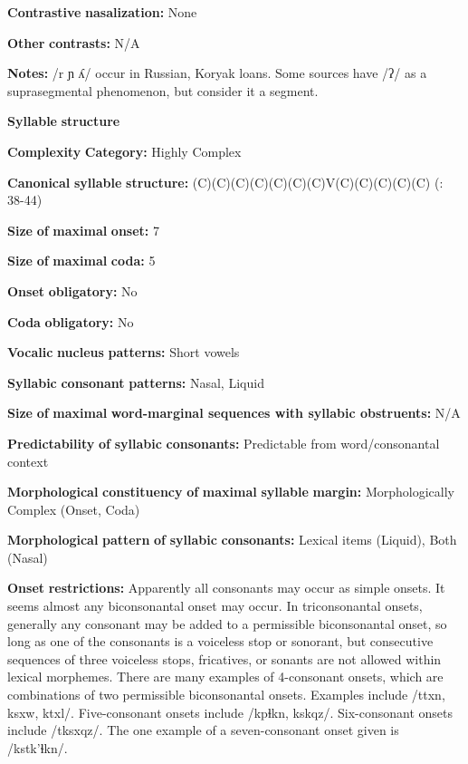\begin{styleBody}
\textbf{Contrastive} \textbf{nasalization:} None

\textbf{Other} \textbf{contrasts:} N/A

\textbf{Notes:} /r ɲ ʎ/ occur in Russian, Koryak loans. Some sources have /ʔ/ as a suprasegmental phenomenon, but \citet{GeorgVolodin1999} consider it a segment. 

\textbf{Syllable} \textbf{structure}

\textbf{Complexity} \textbf{Category:} Highly Complex

\textbf{Canonical} \textbf{syllable} \textbf{structure:} (C)(C)(C)(C)(C)(C)(C)V(C)(C)(C)(C)(C) (\citealt{GeorgVolodin1999}: 38-44)

\textbf{Size} \textbf{of} \textbf{maximal} \textbf{onset:} 7

\textbf{Size} \textbf{of} \textbf{maximal} \textbf{coda:} 5

\textbf{Onset} \textbf{obligatory:} No

\textbf{Coda} \textbf{obligatory:} No

\textbf{Vocalic} \textbf{nucleus} \textbf{patterns:} Short vowels

\textbf{Syllabic} \textbf{consonant} \textbf{patterns:} Nasal, Liquid

\textbf{Size} \textbf{of} \textbf{maximal} \textbf{word{}-marginal sequences with syllabic obstruents:} N/A

\textbf{Predictability} \textbf{of} \textbf{syllabic} \textbf{consonants:} Predictable from word/consonantal context

\textbf{Morphological} \textbf{constituency} \textbf{of} \textbf{maximal} \textbf{syllable} \textbf{margin:} Morphologically Complex (Onset, Coda)

\textbf{Morphological} \textbf{pattern} \textbf{of} \textbf{syllabic} \textbf{consonants:} Lexical items (Liquid), Both (Nasal)

\textbf{Onset} \textbf{restrictions:} Apparently all consonants may occur as simple onsets. It seems almost any biconsonantal onset may occur. In triconsonantal onsets, generally any consonant may be added to a permissible biconsonantal onset, so long as one of the consonants is a voiceless stop or sonorant, but consecutive sequences of three voiceless stops, fricatives, or sonants are not allowed within lexical morphemes. There are many examples of 4-consonant onsets, which are combinations of two permissible biconsonantal onsets. Examples include /ttxn, ksxw, ktxl/. Five-consonant onsets include /kpɬkn, kskqz/. Six-consonant onsets include /tksxqz/. The one example of a seven-consonant onset given is /kstk’ɬkn/.


\end{styleBody}
